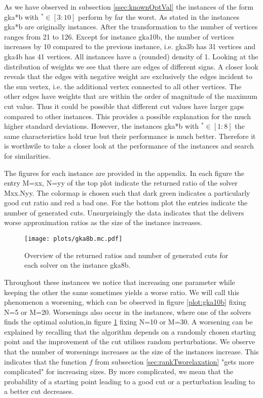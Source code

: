 \documentclass[12pt,a4paper]{article}
\theoremstyle{mythm}
\begin{document}
As we have observed in subsection \ref{ssec:knownOptVal} the instances of the form gka*b with $ ^{ * } \in \left[ 3:10 \right]  $ perform by far the worst.
As stated in \cite{MallachLibrary} the instances gka*b are originally \BQP instances.
After the transformation to \MCP the number of vertices ranges from 21 to 126.
Except for instance gka10b, the number of vertices increases by 10 compared to the previous instance, i.e. gka3b has 31 vertices and gka4b has 41 vertices.
All instances have a (rounded) density of 1.
Looking at the distribution of weights we see that there are edges of different signs.
A closer look reveals that the edges with negative weight are exclusively the edges incident to the sun vertex, i.e. the additional vertex connected to all other vertices.
The other edges have weights that are within the order of magnitude of the maximum cut value.
Thus it could be possible that different cut values have larger gaps compared to other instances. 
This provides a possible explanation for the much higher standard deviations.
However, the instances gka*b with $ ^{ * }  \in \left[ 1:8 \right]  $ the same characteristics hold true but their performance is much better.
Therefore it is worthwile to take a closer look at the performance of the instances and search for similarities.

The figures for each instance are provided in the appendix. 
In each figure the entry M=xx, N=yy of the top plot indicate the returned ratio of the solver Mxx.Nyy.
The colormap is chosen such that dark green indicates a particularly good cut ratio and red a bad one.
For the bottom plot the entries indicate the number of generated cuts.
Unsurprisingly the data indicates that the \BH delivers worse approximation ratios as the size of the instance increases.

\begin{figure}
\texttt{[image: plots/gka8b.mc.pdf]}
\caption{Overview of the returned ratios and number of generated cuts for each solver on the instance gka8b.}
\label{plot:gka8b} 
\end{figure}

Throughout these instances we notice that increasing one parameter while keeping the other the same sometimes yields a worse ratio.
We will call this phenomenon a worsening, which can be observed in figure \ref{plot:gka10b} fixing N=5 or M=20. 
Worsenings also occur in the instances, where one of the solvers finds the optimal solution,in figure \ref{plot:gka8b} fixing N=10 or M=30.
A worsening can be explained by recalling that the algorithm depends on a randomly chosen starting point and the improvement of the cut utilises random perturbations.
We observe that the number of worsenings increases as the size of the instances increase.
This indicates that the function $ f $ from subsection \ref{sec:rankTworelaxation} "gets more complicated" for increasing sizes.
By more complicated, we mean that the probability of a starting point leading to a good cut or a perturbation leading to a better cut decreases.
\end{document}
